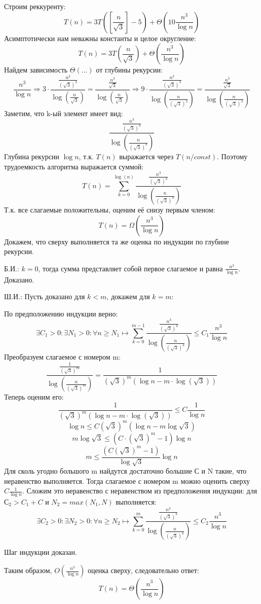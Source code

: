 \documentclass{article}
\begin{document}
Строим реккуренту:
$$ T(n)=3 T\left(\left[\frac{n}{\sqrt{3}}\right]-5\right)+\Theta\left(10 \frac{n^{3}}{\log n}\right)$$
Асимптотически нам неважны константы и целое округление:
$$T(n)=3 T\left(\frac{n}{\sqrt{3}}\right)+\Theta\left( \frac{n^{3}}{\log n}\right)$$
Найдем зависимость $\Theta(...)$ от глубины рекурсии:
$$ \frac{n^{3}}{\log n} \Rightarrow 3 \cdot \frac{\frac{n^{3}}{(\sqrt{3})^{3}}}{\log \left(\frac{n}{\sqrt{3}}\right)}=\frac{\frac{n^{3}}{\sqrt{3}}}{\log \left(\frac{n}{\sqrt{3}}\right)}\Rightarrow 9 \cdot \frac{\frac{n^{3}}{(\sqrt{3})^{3}}}{\log \left(\frac{n}{(\sqrt{3})^{2}}\right)}=\frac{\frac{n^{3}}{\sqrt{3}}}{\log \left(\frac{n}{(\sqrt{3})^{2}}\right)}$$
Заметим, что k-ый элемент имеет вид:
$$ \frac{\frac{n^{3}}{(\sqrt{3})^{k}}}{\log \left(\frac{n}{(\sqrt{3})^{k}}\right)}$$
Глубина рекурсии $\log n$, т.к. $T(n)$ выражается через $T(n/const)$. Поэтому трудоемкость алгоритма выражается суммой:
$$T(n)=\sum\limits_{k=0}^{\log (n)} \frac{\frac{n^{3}}{(\sqrt{3})^{k}}}{\log \left(\frac{n}{(\sqrt{3})^{k}}\right)}$$
Т.к. все слагаемые положительны, оценим её снизу первым членом:
$$T(n) = \Omega(\frac{n^{3}}{\log n})$$
Докажем, что сверху выполняется та же оценка по индукции по глубине рекурсии.

Б.И.: $k = 0$, тогда сумма представляет собой первое слагаемое и равна $\frac{n^{3}}{\log n}$. Доказано.

Ш.И.: Пусть доказано для $k < m$, докажем для $k = m$:

По предположению индукции верно:
$$\exists C_1>0: \exists N_1>0: \forall n \geq N_1 \mapsto \sum_{k=0}^{m-1} \frac{\frac{n^{3}}{(\sqrt{3})^{k}}}{\log \left(\frac{n}{(\sqrt{3})^k}\right)} \leq C_1 \frac{n^{3}}{\log n}$$
Преобразуем слагаемое с номером m:
$$ \frac{\frac{1}{(\sqrt{3})^{m}}}{\log \left(\frac{n}{(\sqrt{3})^m}\right)} = \frac{1}{(\sqrt{3})^{m}(\log n-m \cdot \log (\sqrt{3}))}
$$
Теперь оценим его:
$$
\frac{1}{(\sqrt{3})^{m}(\log n-m \cdot \log (\sqrt{3}))} \leq C \frac{1}{\log n}
$$
$$
\log n \leq C(\sqrt{3})^{m}(\log n-m \log \sqrt{3})
$$
$$
m \log \sqrt{3} \leq\left(C \cdot(\sqrt{3})^{m}-1\right) \log n
$$
$$
m \leq \frac{\left(C(\sqrt{3})^{m}-1\right)}{\log \sqrt{3}} \log n
$$
Для сколь угодно большого m найдутся достаточно большие С и N такие, что неравенство выполняется. Тогда слагаемое с номером m можно оценить сверху $C \frac{1}{\log n}$.
Сложим это неравенство с неравенством из предположения индукции: для  $С_2 > C_1 + C$ и $N_2 = max(N_1, N)$ выполняется:
$$\exists C_2>0: \exists N_2>0: \forall n \geq N_2 \mapsto \sum_{k=0}^{m} \frac{\frac{n^{3}}{(\sqrt{3})^{k}}}{\log \left(\frac{n}{(\sqrt{3})^k}\right)} \leq C_2 \frac{n^{3}}{\log n}$$

Шаг индукции доказан.

Таким образом, $O(\frac{n^3}{\log n})$ оценка сверху, следовательно ответ:
$$T(n) = \Theta\left(\frac{n^3}{\log n}\right)$$
\end{document}
